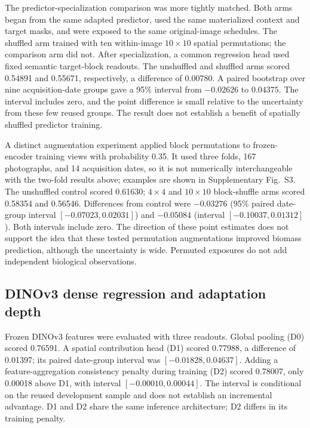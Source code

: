 \documentclass[pdflatex,a4paper,sn-nature]{sn-jnl}
\begin{document}
The predictor-specialization comparison was more tightly matched. Both arms began from the same adapted predictor, used the same materialized context and target masks, and were exposed to the same original-image schedules. The shuffled arm trained with ten within-image $10\times10$ spatial permutations; the comparison arm did not. After specialization, a common regression head used fixed semantic target-block readouts. The unshuffled and shuffled arms scored 0.54891 and 0.55671, respectively, a difference of 0.00780. A paired bootstrap over nine acquisition-date groups gave a 95\% interval from $-0.02626$ to $0.04375$. The interval includes zero, and the point difference is small relative to the uncertainty from these few reused groups. The result does not establish a benefit of spatially shuffled predictor training.

A distinct augmentation experiment applied block permutations to frozen-encoder training views with probability 0.35. It used three folds, 167 photographs, and 14 acquisition dates, so it is not numerically interchangeable with the two-fold results above; examples are shown in Supplementary Fig.~S3. The unshuffled control scored 0.61630; $4\times4$ and $10\times10$ block-shuffle arms scored 0.58354 and 0.56546. Differences from control were $-0.03276$ (95\% paired date-group interval $[-0.07023,0.02031]$) and $-0.05084$ (interval $[-0.10037,0.01312]$). Both intervals include zero. The direction of these point estimates does not support the idea that these tested permutation augmentations improved biomass prediction, although the uncertainty is wide. Permuted exposures do not add independent biological observations.

\subsection{DINOv3 dense regression and adaptation depth}
Frozen DINOv3 features were evaluated with three readouts. Global pooling (D0) scored 0.76591. A spatial contribution head (D1) scored 0.77988, a difference of 0.01397; its paired date-group interval was $[-0.01828,0.04637]$. Adding a feature-aggregation consistency penalty during training (D2) scored 0.78007, only 0.00018 above D1, with interval $[-0.00010,0.00044]$. The interval is conditional on the reused development sample and does not establish an incremental advantage. D1 and D2 share the same inference architecture; D2 differs in its training penalty.
\end{document}

